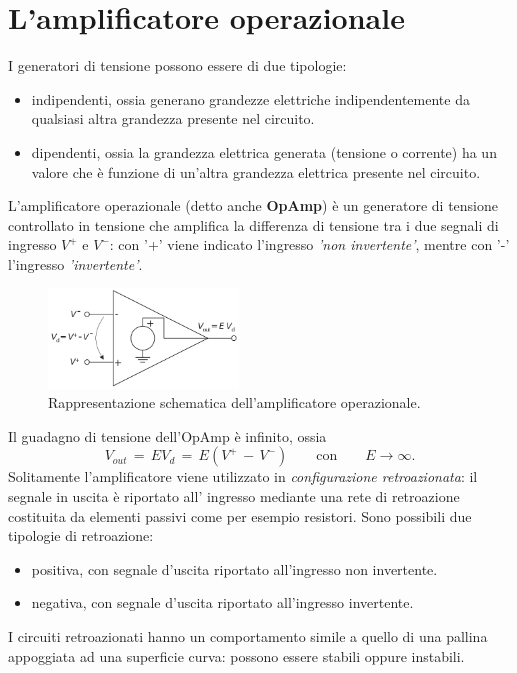 \section{L'amplificatore operazionale}

I generatori di tensione possono essere di due tipologie:
\begin{itemize}
    \item indipendenti, ossia generano grandezze elettriche indipendentemente da qualsiasi altra grandezza presente nel
    circuito.
    \item dipendenti, ossia la grandezza elettrica generata (tensione o corrente) ha un valore che è funzione di un'altra 
    grandezza elettrica presente nel circuito.
\end{itemize}
L'amplificatore operazionale (detto anche \textbf{OpAmp}) è un generatore di tensione controllato in tensione che 
amplifica la differenza di tensione tra i due segnali di ingresso $V^+$ e $V^-$: con '+' viene indicato l'ingresso
\textit{'non invertente'}, mentre con '-' l'ingresso \textit{'invertente'}. 
\begin{figure}[H]
    \centering
    \includegraphics[width=0.45\textwidth]{Immagini/OpAmp.png}
    \caption{Rappresentazione schematica dell'amplificatore operazionale.}
    \label{figure: OpAmp}
\end{figure}
Il guadagno di tensione dell'OpAmp è infinito, ossia
\begin{equation}
    V_{out}\,=\,EV_d\,=\,E\left(V^+\,-\,V^-\right)\qquad \text{con} \qquad E \rightarrow \infty.
    \label{equation: Out_OpAmp}
\end{equation}
Solitamente l'amplificatore viene utilizzato in \textit{configurazione retroazionata}: il segnale in uscita è riportato all'
ingresso mediante una rete di retroazione costituita da elementi passivi come per esempio resistori. Sono possibili due tipologie
di retroazione:
\begin{itemize}
    \item positiva, con segnale d'uscita riportato all'ingresso non invertente.
    \item negativa, con segnale d'uscita riportato all'ingresso invertente.
\end{itemize}
I circuiti retroazionati hanno un comportamento simile a quello di una pallina appoggiata ad una superficie curva: possono
essere stabili oppure instabili. 

